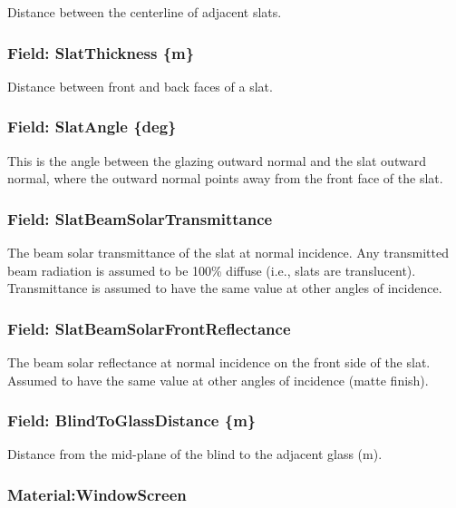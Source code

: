 Distance between the centerline of adjacent slats.

\subsubsection{Field: SlatThickness \{m\}}\label{field-slatthickness-m}

Distance between front and back faces of a slat.

\subsubsection{Field: SlatAngle \{deg\}}\label{field-slatangle-deg}

This is the angle between the glazing outward normal and the slat outward normal, where the outward normal points away from the front face of the slat.

\subsubsection{Field: SlatBeamSolarTransmittance}\label{field-slatbeamsolartransmittance}

The beam solar transmittance of the slat at normal incidence. Any transmitted beam radiation is assumed to be 100\% diffuse (i.e., slats are translucent). Transmittance is assumed to have the same value at other angles of incidence.

\subsubsection{Field: SlatBeamSolarFrontReflectance}\label{field-slatbeamsolarfrontreflectance}

The beam solar reflectance at normal incidence on the front side of the slat. Assumed to have the same value at other angles of incidence (matte finish).

\subsubsection{Field: BlindToGlassDistance \{m\}}\label{field-blindtoglassdistance-m}

Distance from the mid-plane of the blind to the adjacent glass (m).

\subsubsection{Material:WindowScreen}\label{materialwindowscreen}

